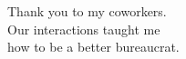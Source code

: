 \thispagestyle{empty}

\begin{center}
\noindent Thank you to my coworkers. \\Our interactions taught me \\how to be a better bureaucrat.
\end{center}